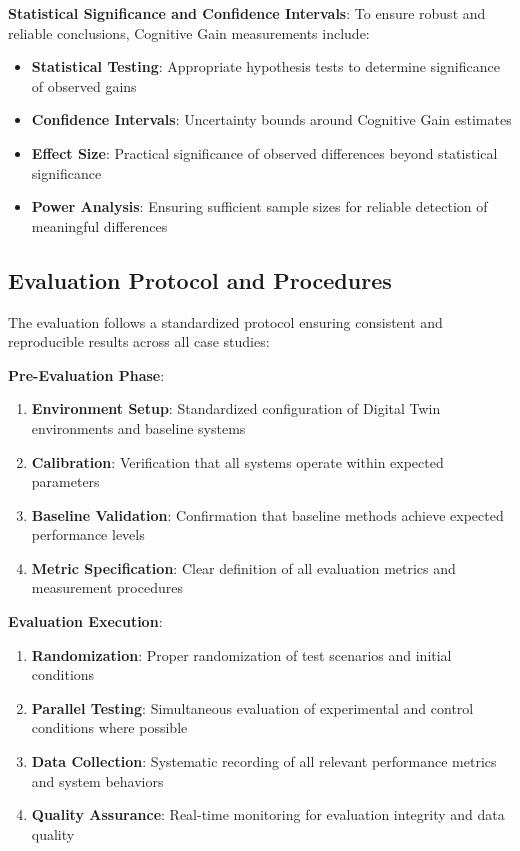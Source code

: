 \textbf{Statistical Significance and Confidence Intervals}: To ensure robust and reliable conclusions, Cognitive Gain measurements include:

\begin{itemize}
\item \textbf{Statistical Testing}: Appropriate hypothesis tests to determine significance of observed gains
\item \textbf{Confidence Intervals}: Uncertainty bounds around Cognitive Gain estimates
\item \textbf{Effect Size}: Practical significance of observed differences beyond statistical significance
\item \textbf{Power Analysis}: Ensuring sufficient sample sizes for reliable detection of meaningful differences
\end{itemize}

\subsection{Evaluation Protocol and Procedures}

The evaluation follows a standardized protocol ensuring consistent and reproducible results across all case studies:

\textbf{Pre-Evaluation Phase}:

\begin{enumerate}
\item \textbf{Environment Setup}: Standardized configuration of Digital Twin environments and baseline systems
\item \textbf{Calibration}: Verification that all systems operate within expected parameters
\item \textbf{Baseline Validation}: Confirmation that baseline methods achieve expected performance levels
\item \textbf{Metric Specification}: Clear definition of all evaluation metrics and measurement procedures
\end{enumerate}

\textbf{Evaluation Execution}:

\begin{enumerate}
\item \textbf{Randomization}: Proper randomization of test scenarios and initial conditions
\item \textbf{Parallel Testing}: Simultaneous evaluation of experimental and control conditions where possible
\item \textbf{Data Collection}: Systematic recording of all relevant performance metrics and system behaviors
\item \textbf{Quality Assurance}: Real-time monitoring for evaluation integrity and data quality
\end{enumerate}

